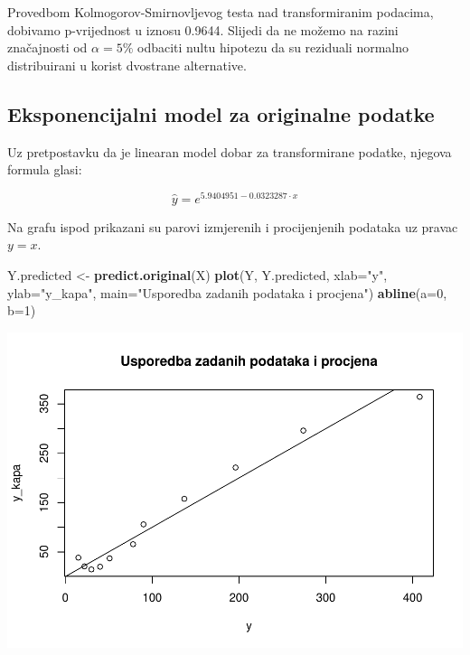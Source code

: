 \documentclass[]{article}
\newenvironment{Shaded}{\begin{snugshade}}{\end{snugshade}}
\newcommand{\KeywordTok}[1]{\textcolor[rgb]{0.13,0.29,0.53}{\textbf{{#1}}}}
\newcommand{\DataTypeTok}[1]{\textcolor[rgb]{0.13,0.29,0.53}{{#1}}}
\newcommand{\DecValTok}[1]{\textcolor[rgb]{0.00,0.00,0.81}{{#1}}}
\newcommand{\StringTok}[1]{\textcolor[rgb]{0.31,0.60,0.02}{{#1}}}
\newcommand{\NormalTok}[1]{{#1}}
\begin{document}
Provedbom Kolmogorov-Smirnovljevog testa nad transformiranim podacima,
dobivamo p-vrijednost u iznosu 0.9644. Slijedi da ne možemo na razini
značajnosti od \(\alpha=5\%\) odbaciti nultu hipotezu da su reziduali
normalno distribuirani u korist dvostrane alternative.

\subsection{Eksponencijalni model za originalne
podatke}\label{eksponencijalni-model-za-originalne-podatke}

Uz pretpostavku da je linearan model dobar za transformirane podatke,
njegova formula glasi:

\[\hat{y} = e^{5.9404951 - 0.0323287 \cdot x} \]

Na grafu ispod prikazani su parovi izmjerenih i procijenjenih podataka
uz pravac \(y=x\).

\begin{Shaded}
\begin{Highlighting}[]
\NormalTok{Y.predicted <-}\StringTok{ }\KeywordTok{predict.original}\NormalTok{(X)}
\KeywordTok{plot}\NormalTok{(Y, Y.predicted, }\DataTypeTok{xlab=}\StringTok{"y"}\NormalTok{, }\DataTypeTok{ylab=}\StringTok{"y_kapa"}\NormalTok{,}
     \DataTypeTok{main=}\StringTok{"Usporedba zadanih podataka i procjena"}\NormalTok{)}
\KeywordTok{abline}\NormalTok{(}\DataTypeTok{a=}\DecValTok{0}\NormalTok{, }\DataTypeTok{b=}\DecValTok{1}\NormalTok{)}
\end{Highlighting}
\end{Shaded}

\includegraphics{Izvjestaj_files/figure-latex/unnamed-chunk-14-1.pdf}
\end{document}

